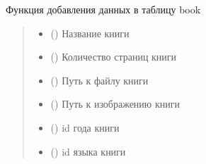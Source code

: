 \documentclass[letterpaper,10pt,russian]{sphinxmanual}
\begin{document}
\begin{fulllineitems}
\begin{fulllineitems}
\label{\detokenize{database.sqlite3_interface.tables:database.sqlite3_interface.tables.book.Book.insert_get_data}}
\pysigstartsignatures
{}
\pysigstopsignatures
\sphinxAtStartPar
Функция добавления данных в таблицу book
\begin{quote}\begin{description}
\begin{itemize}
\item {} 
\sphinxAtStartPar
{} () \textendash{} Название книги

\item {} 
\sphinxAtStartPar
{} () \textendash{} Количество страниц книги

\item {} 
\sphinxAtStartPar
{} () \textendash{} Путь к файлу книги

\item {} 
\sphinxAtStartPar
{} () \textendash{} Путь к изображению книги

\item {} 
\sphinxAtStartPar
{} () \textendash{} id года книги

\item {} 
\sphinxAtStartPar
{} () \textendash{} id языка книги


\end{itemize}
\end{description}
\end{quote}
\end{fulllineitems}
\end{fulllineitems}
\end{document}
